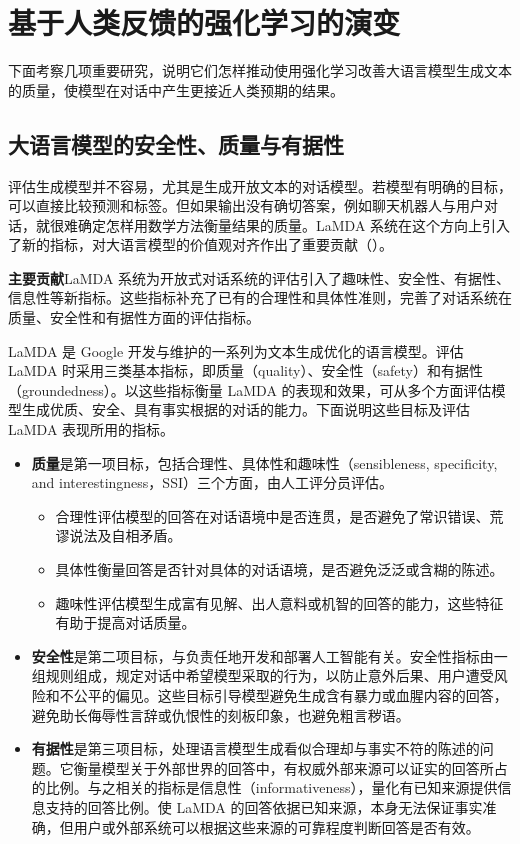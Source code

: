 \section{基于人类反馈的强化学习的演变}
\label{sec:ch05-evolution}
下面考察几项重要研究，说明它们怎样推动使用强化学习改善大语言模型生成文本的质量，使模型在对话中产生更接近人类预期的结果。

\subsection{大语言模型的安全性、质量与有据性}
评估生成模型并不容易，尤其是生成开放文本的对话模型。若模型有明确的目标，可以直接比较预测和标签。但如果输出没有确切答案，例如聊天机器人与用户对话，就很难确定怎样用数学方法衡量结果的质量。LaMDA 系统在这个方向上引入了新的指标，对大语言模型的价值观对齐作出了重要贡献（）。

\begin{keypoint}
\noindent\textbf{主要贡献}\quad LaMDA 系统为开放式对话系统的评估引入了趣味性、安全性、有据性、信息性等新指标。这些指标补充了已有的合理性和具体性准则，完善了对话系统在质量、安全性和有据性方面的评估指标。
\end{keypoint}

LaMDA 是 Google 开发与维护的一系列为文本生成优化的语言模型。评估 LaMDA 时采用三类基本指标，即质量（quality）、安全性（safety）和有据性（groundedness）。以这些指标衡量 LaMDA 的表现和效果，可从多个方面评估模型生成优质、安全、具有事实根据的对话的能力。下面说明这些目标及评估 LaMDA 表现所用的指标。

\begin{itemize}
\item \textbf{质量}是第一项目标，包括合理性、具体性和趣味性（sensibleness, specificity, and interestingness，SSI）三个方面，由人工评分员评估。
  \begin{itemize}
  \item 合理性评估模型的回答在对话语境中是否连贯，是否避免了常识错误、荒谬说法及自相矛盾。
  \item 具体性衡量回答是否针对具体的对话语境，是否避免泛泛或含糊的陈述。
  \item 趣味性评估模型生成富有见解、出人意料或机智的回答的能力，这些特征有助于提高对话质量。
  \end{itemize}
\item \textbf{安全性}是第二项目标，与负责任地开发和部署人工智能有关。安全性指标由一组规则组成，规定对话中希望模型采取的行为，以防止意外后果、用户遭受风险和不公平的偏见。这些目标引导模型避免生成含有暴力或血腥内容的回答，避免助长侮辱性言辞或仇恨性的刻板印象，也避免粗言秽语。
\item \textbf{有据性}是第三项目标，处理语言模型生成看似合理却与事实不符的陈述的问题。它衡量模型关于外部世界的回答中，有权威外部来源可以证实的回答所占的比例。与之相关的指标是信息性（informativeness），量化有已知来源提供信息支持的回答比例。使 LaMDA 的回答依据已知来源，本身无法保证事实准确，但用户或外部系统可以根据这些来源的可靠程度判断回答是否有效。
\end{itemize}

